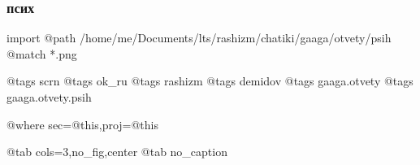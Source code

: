  
 
 
 
 

\subsubsection{псих}

\ifcmt
  import
    @path /home/me/Documents/lts/rashizm/chatiki/gaaga/otvety/psih
    @match *.png

    @tags scrn
    @tags ok_ru
    @tags rashizm
    @tags demidov
    @tags gaaga.otvety
    @tags gaaga.otvety.psih

    @where sec=@this,proj=@this
  
    @tab cols=3,no_fig,center
    @tab no_caption
\fi
